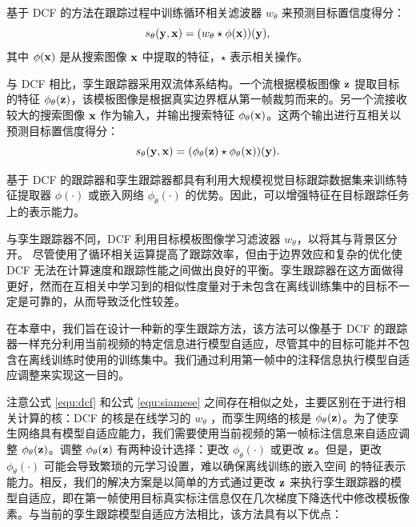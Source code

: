 基于 DCF 的方法在跟踪过程中训练循环相关滤波器 $w_{\theta}$ 来预测目标置信度得分：
\begin{equation}
    s_\theta(\textbf y,\textbf x)=(w_\theta \star \phi(\textbf x))(\textbf y),
    \label{equ:dcf}
\end{equation}
其中 $\phi(\textbf x)$ 是从搜索图像 $\textbf x$ 中提取的特征，$\star$ 表示相关操作。

与 DCF 相比，孪生跟踪器采用双流体系结构。一个流根据模板图像 $\textbf z$ 提取目标的特征 $\phi_\theta(\textbf z)$，该模板图像是根据真实边界框从第一帧裁剪而来的。另一个流接收较大的搜索图像 $\textbf x$ 作为输入，并输出搜索特征 $\phi_\theta(\textbf x)$。这两个输出进行互相关以预测目标置信度得分：
\begin{equation}
    s_\theta(\textbf y,\textbf x)=(\phi_\theta(\textbf z) \star \phi_\theta(\textbf x))(\textbf y).
    \label{equ:siamese}
\end{equation}

基于 DCF 的跟踪器和孪生跟踪器都具有利用大规模视觉目标跟踪数据集来训练特征提取器 $\phi(\cdot)$ 或嵌入网络 $\phi_{\theta}(\cdot)$ 的优势。因此，可以增强特征在目标跟踪任务上的表示能力。

与孪生跟踪器不同，DCF 利用目标模板图像学习滤波器 $w_\theta$，以将其与背景区分开。
尽管使用了循环相关运算提高了跟踪效率，但由于边界效应和复杂的优化使 DCF 无法在计算速度和跟踪性能之间做出良好的平衡。孪生跟踪器在这方面做得更好，然而在互相关中学习到的相似性度量对于未包含在离线训练集中的目标不一定是可靠的，从而导致泛化性较差。

在本章中，我们旨在设计一种新的孪生跟踪方法，该方法可以像基于 DCF 的跟踪器一样充分利用当前视频的特定信息进行模型自适应，尽管其中的目标可能并不包含在离线训练时使用的训练集中。我们通过利用第一帧中的注释信息执行模型自适应调整来实现这一目的。

注意公式 \ref{equ:dcf} 和公式 \ref{equ:siamese} 之间存在相似之处，主要区别在于进行相关计算的核：DCF 的核是在线学习的 $w_{\theta}$ ，而孪生网络的核是 $\phi_\theta(\textbf z)$。为了使孪生网络具有模型自适应能力，我们需要使用当前视频的第一帧标注信息来自适应调整 $\phi_\theta(\textbf z)$。调整 $\phi_\theta(\textbf z)$ 有两种设计选择：更改 $\phi_\theta(\cdot)$ 或更改 $\textbf z$。但是，更改 $\phi_\theta(\cdot)$ 可能会导致繁琐的元学习设置，难以确保离线训练的嵌入空间 \cite{ROAM, MetaRTT} 的特征表示能力。相反，我们的解决方案是以简单的方式通过更改 $\textbf z$ 来执行孪生跟踪器的模型自适应，即在第一帧使用目标真实标注信息仅在几次梯度下降迭代中修改模板像素。与当前的孪生跟踪模型自适应方法相比，该方法具有以下优点：

